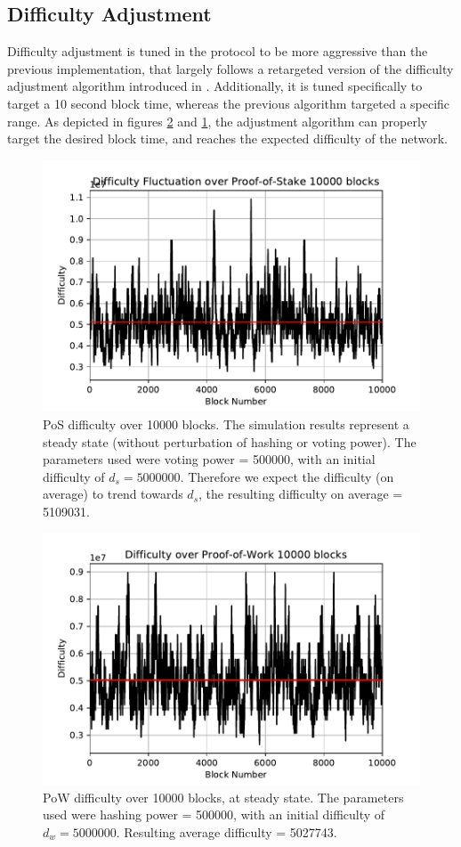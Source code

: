 \subsection{Difficulty Adjustment}

Difficulty adjustment is tuned in the protocol to be more aggressive than the previous implementation,
that largely follows a retargeted version of the difficulty adjustment algorithm
introduced in \cite{wood2014ethereum}. Additionally, it is tuned specifically to target a
10 second block time, whereas the previous algorithm targeted a specific range. As depicted
in figures \ref{fig:pow_block_difficulty} and \ref{fig:pos_block_difficulty}, the 
adjustment algorithm can properly target the desired block time, and reaches
the expected difficulty of the network.

\begin{figure}[h]
    \centering
    \includegraphics[width=0.55\linewidth]{assets/sim_results/pos_10000_difficulty.pdf}
    \caption{PoS difficulty over 10000 blocks. The simulation results represent
    a steady state (without perturbation of hashing or voting power). The parameters used
    were voting power = 500000, with an initial difficulty of $d_s=5000000$. Therefore we
    expect the difficulty (on average) to trend towards $d_s$, the resulting difficulty on
    average = 5109031.}
    \label{fig:pos_block_difficulty}
\end{figure}

\begin{figure}[ht]
    \centering
    \includegraphics[width=0.55\linewidth]{assets/sim_results/pow_10000_difficulty.pdf}
    \caption{PoW difficulty over 10000 blocks, at steady state. The parameters used
    were hashing power = 500000, with an initial difficulty of $d_w=5000000$. Resulting average
    difficulty = 5027743.}
    \label{fig:pow_block_difficulty}
\end{figure}
